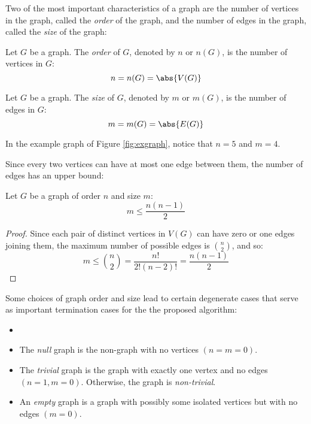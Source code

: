 Two of the most important characteristics of a graph are the number of vertices in the graph, called the \emph{order}
of the graph, and the number of edges in the graph, called the \emph{size} of the graph:

\begin{definition}[Order]
  Let \(G\) be a graph.  The \emph{order} of \(G\), denoted by \(n\) or \(n(G)\), is the number of vertices in
  \(G\):
  \[n=n(G)=\abs{V(G)}\]
\end{definition}

\begin{definition}[Size]
  Let \(G\) be a graph.  The \emph{size} of \(G\), denoted by \(m\) or \(m(G)\), is the number of edges in \(G\):
  \[m=m(G)=\abs{E(G)}\]
\end{definition}

In the example graph of Figure \ref{fig:exgraph}, notice that \(n=5\) and \(m=4\).

Since every two vertices can have at most one edge between them, the number of edges has an upper bound:

\begin{theorem}
  Let \(G\) be a graph of order \(n\) and size \(m\):
  \[m\le\frac{n(n-1)}{2}\]
\end{theorem}

\begin{proof}
  Since each pair of distinct vertices in \(V(G)\) can have zero or one edges joining them, the maximum number of
  possible edges is \(\binom{n}{2}\), and so:
  \[m\le\binom{n}{2}=\frac{n!}{2!(n-2)!}=\frac{n(n-1)}{2}\]
\end{proof}

Some choices of graph order and size lead to certain degenerate cases that serve as important termination cases for
the the proposed algorithm:

\begin{definition}
  \begin{itemize}[left=0pt]
  \item[]
  \item The \emph{null} graph is the non-graph with no vertices \((n=m=0)\).
  \item The \emph{trivial} graph is the graph with exactly one vertex and no edges \((n=1,m=0)\).  Otherwise, the
    graph is \emph{non-trivial}.
    \item An \emph{empty} graph is a graph with possibly some isolated vertices but with no edges \((m=0)\).
  \end{itemize}
\end{definition}

